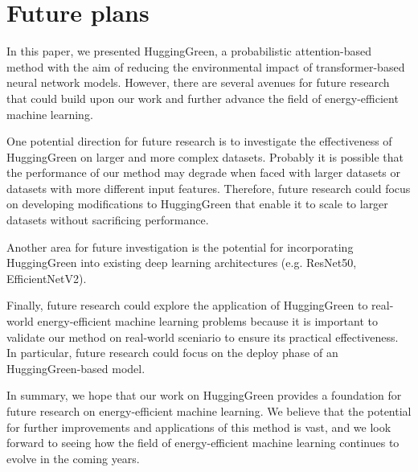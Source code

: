 \section{Future plans}
\label{future}
In this paper, we presented HuggingGreen, a probabilistic attention-based method with the aim of reducing the environmental impact of transformer-based neural network models. However, there are several avenues for future research that could build upon our work and further advance the field of energy-efficient machine learning.

One potential direction for future research is to investigate the effectiveness of HuggingGreen on larger and more complex datasets. Probably it is possible that the performance of our method may degrade when faced with larger datasets or datasets with more different input features. Therefore, future research could focus on developing modifications to HuggingGreen that enable it to scale to larger datasets without sacrificing performance.

Another area for future investigation is the potential for incorporating HuggingGreen into existing deep learning architectures (e.g. ResNet50, EfficientNetV2).

Finally, future research could explore the application of HuggingGreen to real-world energy-efficient machine learning problems because it is important to validate our method on real-world sceniario to ensure its practical effectiveness. In particular, future research could focus on the deploy phase of an HuggingGreen-based model.

In summary, we hope that our work on HuggingGreen provides a foundation for future research on energy-efficient machine learning. We believe that the potential for further improvements and applications of this method is vast, and we look forward to seeing how the field of energy-efficient machine learning continues to evolve in the coming years.